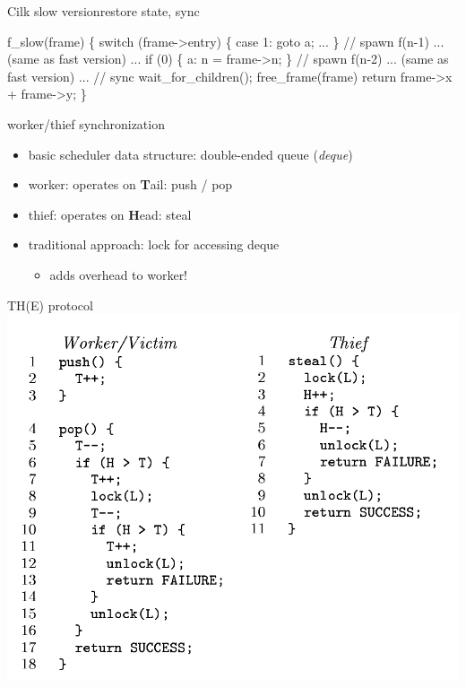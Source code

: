 \documentclass[13pt]{beamer}
\begin{document}
\begin{frame}[fragile]{Cilk slow version}{restore state, sync}
\begin{semiverbatim}{\small
f_slow(frame) \{
    switch (frame->entry) \{
        case 1: goto a;
        ...
    \}
    // spawn f(n-1)
    ... (same as fast version) ...
    if (0) \{ a: n = frame->n; \}
    // spawn f(n-2)
    ... (same as fast version) ...
    // sync
    wait_for_children();
    free_frame(frame)
    return frame->x + frame->y;
\}}
\end{semiverbatim}
\end{frame}


\begin{frame}{worker/thief synchronization}{}
\begin{itemize}
    \item basic scheduler data structure: double-ended queue (\emph{deque})
    \item worker: operates on {\bfseries T}ail: push / pop
    \item thief: operates on {\bfseries H}ead: steal

    \medskip
    \item traditional approach: lock for accessing deque
    \begin{itemize}
        \item adds overhead to worker!
    \end{itemize}
\end{itemize}
\end{frame}

\begin{frame}{TH(E) protocol}{}
	\includegraphics[width=.9\textwidth]{figs/simplified-the}
\end{frame}
\end{document}
